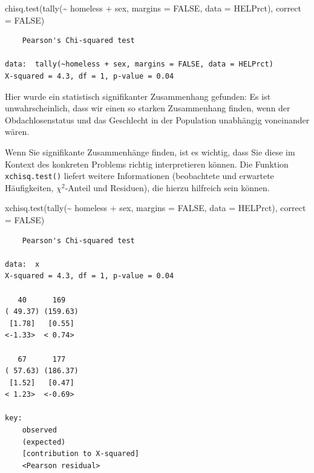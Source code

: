 \documentclass[
  ngerman,
]{scrbook}
\newenvironment{Shaded}{\begin{snugshade}}{\end{snugshade}}
\newcommand{\AttributeTok}[1]{\textcolor[rgb]{0.77,0.63,0.00}{#1}}
\newcommand{\ConstantTok}[1]{\textcolor[rgb]{0.00,0.00,0.00}{#1}}
\newcommand{\FunctionTok}[1]{\textcolor[rgb]{0.00,0.00,0.00}{#1}}
\newcommand{\NormalTok}[1]{#1}
\newcommand{\SpecialCharTok}[1]{\textcolor[rgb]{0.00,0.00,0.00}{#1}}
\begin{document}
\begin{Shaded}
\begin{Highlighting}[]
\FunctionTok{chisq.test}\NormalTok{(}\FunctionTok{tally}\NormalTok{(}\SpecialCharTok{\textasciitilde{}}\NormalTok{ homeless }\SpecialCharTok{+}\NormalTok{ sex, }
                    \AttributeTok{margins =} \ConstantTok{FALSE}\NormalTok{,}
                    \AttributeTok{data =}\NormalTok{ HELPrct), }
                    \AttributeTok{correct =} \ConstantTok{FALSE}\NormalTok{)}
\end{Highlighting}
\end{Shaded}

\begin{verbatim}
    Pearson's Chi-squared test

data:  tally(~homeless + sex, margins = FALSE, data = HELPrct)
X-squared = 4.3, df = 1, p-value = 0.04
\end{verbatim}

Hier wurde ein statistisch signifikanter Zusammenhang gefunden: Es ist unwahrscheinlich, dass wir einen so starken Zusammenhang finden, wenn der Obdachlosenstatus und das Geschlecht in der Population unabhängig voneinander wären.

Wenn Sie signifikante Zusammenhänge finden, ist es wichtig, dass Sie diese im Kontext des konkreten Problems richtig interpretieren können. Die Funktion \texttt{xchisq.test()} liefert weitere Informationen (beobachtete und erwartete Häufigkeiten, \(\chi^2\)-Anteil und Residuen), die hierzu hilfreich sein können.

\begin{Shaded}
\begin{Highlighting}[]
\FunctionTok{xchisq.test}\NormalTok{(}\FunctionTok{tally}\NormalTok{(}\SpecialCharTok{\textasciitilde{}}\NormalTok{ homeless }\SpecialCharTok{+}\NormalTok{ sex, }
                     \AttributeTok{margins =} \ConstantTok{FALSE}\NormalTok{, }
                     \AttributeTok{data =}\NormalTok{ HELPrct), }
                     \AttributeTok{correct =} \ConstantTok{FALSE}\NormalTok{)}
\end{Highlighting}
\end{Shaded}

\begin{verbatim}
    Pearson's Chi-squared test

data:  x
X-squared = 4.3, df = 1, p-value = 0.04

   40      169   
( 49.37) (159.63)
 [1.78]   [0.55] 
<-1.33>  < 0.74> 
   
   67      177   
( 57.63) (186.37)
 [1.52]   [0.47] 
< 1.23>  <-0.69> 
   
key:
    observed
    (expected)
    [contribution to X-squared]
    <Pearson residual>
\end{verbatim}
\end{document}
